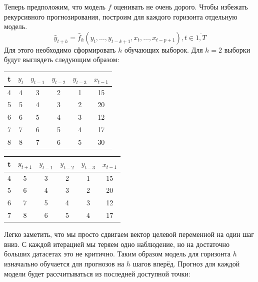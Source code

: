 \documentclass[12pt,fleqn]{article}
\begin{document}
Теперь предположим, что модель $f$ оценивать не очень дорого.
Чтобы избежать рекурсивного прогнозирования, построим для каждого горизонта отдельную модель.
\begin{equation}
  \hat{y}_{t+h} = \hat{f}_h(y_t, \ldots, y_{t-k+1}, x_{t}, \ldots, x_{t-p+1}), t \in \overline{1, T}
\end{equation}
Для этого необходимо сформировать $h$ обучающих выборок.
Для $h=2$ выборки будут выглядеть следующим образом:

\begin{table}[!ht]
  \centering
  \begin{tabular}[t]{|c|c|cccc|}
    \hline
    t & $y_t$ & $y_{t-1}$ & $y_{t-2}$ & $y_{t-3}$ & $x_{t-1}$ \\ \hline
    4 & 4              & 3                  & 2         & 1         & 15        \\
    5 & 5              & 4                  & 3         & 2         & 20        \\
    6 & 6              & 5                  & 4         & 3         & 12        \\
    7 & 7              & 6                  & 5         & 4         & 17        \\
    8 & 8              & 7                  & 6         & 5         & 30        \\ \hline
  \end{tabular}
  \quad
  \begin{tabular}[t]{|c|c|cccc|}
    \hline
    t & $y_{t+1}$      & $y_{t-1}$ & $y_{t-2}$ & $y_{t-3}$ & $x_{t-1}$ \\ \hline
    4 & 5                & 3                  & 2         & 1         & 15        \\
    5 & 6                & 4                  & 3         & 2         & 20        \\
    6 & 7                & 5                  & 4         & 3         & 12        \\
    7 & 8                & 6                  & 5         & 4         & 17        \\ \hline
  \end{tabular}
\end{table}

Легко заметить, что мы просто сдвигаем вектор целевой переменной на один шаг вниз.
С каждой итерацией мы теряем одно наблюдение, но на достаточно больших датасетах это не критично.
Таким образом модель для горизонта $h$ изначально обучается для прогнозов на $h$ шагов вперёд.
Прогноз для каждой модели будет рассчитываться из последней доступной точки:
\end{document}
